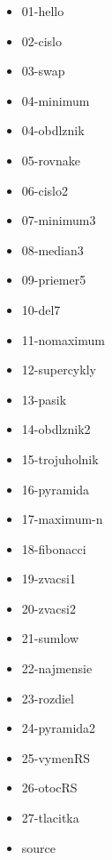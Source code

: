 



\begin{itemize}
\item 01-hello
\item 02-cislo
\item 03-swap
\item 04-minimum
\item 04-obdlznik
\item 05-rovnake
\item 06-cislo2
\item 07-minimum3
\item 08-median3
\item 09-priemer5
\item 10-del7
\item 11-nomaximum
\item 12-supercykly
\item 13-pasik
\item 14-obdlznik2
\item 15-trojuholnik
\item 16-pyramida
\item 17-maximum-n
\item 18-fibonacci
\item 19-zvacsi1
\item 20-zvacsi2
\item 21-sumlow
\item 22-najmensie
\item 23-rozdiel
\item 24-pyramida2
\item 25-vymenRS
\item 26-otocRS
\item 27-tlacitka
\item source
\end{itemize}

